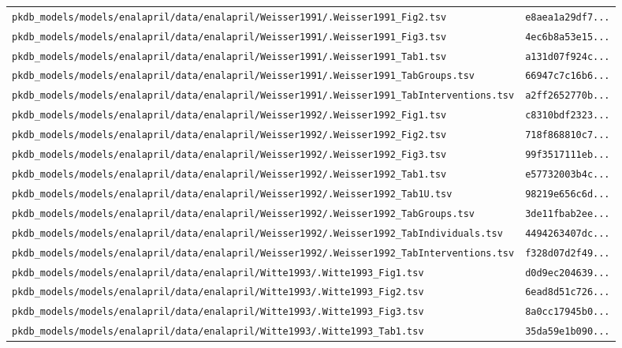 \documentclass{article}
\begin{document}
\begin{longtable}{ll}
\texttt{pkdb\_models/models/enalapril/data/enalapril/Weisser1991/.Weisser1991\_Fig2.tsv} & \texttt{e8aea1a29df7...} \\
\texttt{pkdb\_models/models/enalapril/data/enalapril/Weisser1991/.Weisser1991\_Fig3.tsv} & \texttt{4ec6b8a53e15...} \\
\texttt{pkdb\_models/models/enalapril/data/enalapril/Weisser1991/.Weisser1991\_Tab1.tsv} & \texttt{a131d07f924c...} \\
\texttt{pkdb\_models/models/enalapril/data/enalapril/Weisser1991/.Weisser1991\_TabGroups.tsv} & \texttt{66947c7c16b6...} \\
\texttt{pkdb\_models/models/enalapril/data/enalapril/Weisser1991/.Weisser1991\_TabInterventions.tsv} & \texttt{a2ff2652770b...} \\
\texttt{pkdb\_models/models/enalapril/data/enalapril/Weisser1992/.Weisser1992\_Fig1.tsv} & \texttt{c8310bdf2323...} \\
\texttt{pkdb\_models/models/enalapril/data/enalapril/Weisser1992/.Weisser1992\_Fig2.tsv} & \texttt{718f868810c7...} \\
\texttt{pkdb\_models/models/enalapril/data/enalapril/Weisser1992/.Weisser1992\_Fig3.tsv} & \texttt{99f3517111eb...} \\
\texttt{pkdb\_models/models/enalapril/data/enalapril/Weisser1992/.Weisser1992\_Tab1.tsv} & \texttt{e57732003b4c...} \\
\texttt{pkdb\_models/models/enalapril/data/enalapril/Weisser1992/.Weisser1992\_Tab1U.tsv} & \texttt{98219e656c6d...} \\
\texttt{pkdb\_models/models/enalapril/data/enalapril/Weisser1992/.Weisser1992\_TabGroups.tsv} & \texttt{3de11fbab2ee...} \\
\texttt{pkdb\_models/models/enalapril/data/enalapril/Weisser1992/.Weisser1992\_TabIndividuals.tsv} & \texttt{4494263407dc...} \\
\texttt{pkdb\_models/models/enalapril/data/enalapril/Weisser1992/.Weisser1992\_TabInterventions.tsv} & \texttt{f328d07d2f49...} \\
\texttt{pkdb\_models/models/enalapril/data/enalapril/Witte1993/.Witte1993\_Fig1.tsv} & \texttt{d0d9ec204639...} \\
\texttt{pkdb\_models/models/enalapril/data/enalapril/Witte1993/.Witte1993\_Fig2.tsv} & \texttt{6ead8d51c726...} \\
\texttt{pkdb\_models/models/enalapril/data/enalapril/Witte1993/.Witte1993\_Fig3.tsv} & \texttt{8a0cc17945b0...} \\
\texttt{pkdb\_models/models/enalapril/data/enalapril/Witte1993/.Witte1993\_Tab1.tsv} & \texttt{35da59e1b090...} \\

\end{longtable}
\end{document}
